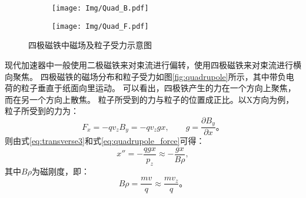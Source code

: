 \begin{figure}[!tbh]
    \centering
    \begin{subfigure}[b]{0.45\textwidth}
        \texttt{[image: Img/Quad\_B.pdf]}
    \end{subfigure}
    \qquad
    \begin{subfigure}[b]{0.4\textwidth}
        \texttt{[image: Img/Quad\_F.pdf]}
    \end{subfigure}
    \caption{四极磁铁中磁场及粒子受力示意图}
    \label{fig:quadrupole}
\end{figure}
现代加速器中一般使用二极磁铁来对束流进行偏转，使用四极磁铁来对束流进行横向聚焦。
四极磁铁的磁场分布和粒子受力如图\eqref{fig:quadrupole}所示\cite{qinq2011ring}，其中带负电荷的粒子垂直于纸面向里运动。
可以看出，四极铁产生的力在一个方向上聚焦，而在另一个方向上散焦。
粒子所受到的力与粒子的位置成正比。以X方向为例，粒子所受到的力为：
\begin{equation}
    \label{eq:quadrupole_force}
    F_x = -q {v}_{z} {B}_{y} = -q {v}_{z} g x, \qquad g=\frac{\partial B_y}{\partial x}\text{。}
\end{equation}
则由式\eqref{eq:transverse3}和式\eqref{eq:quadrupole_force}可得：
\begin{equation}
    \label{eq:quadrupole_force2}
    x'' = -\frac{qgx}{p_z} \approx -\frac{gx}{B\rho},
\end{equation}
其中${B\rho}$为磁刚度，即：
\begin{equation}
    {B\rho}=\frac{mv}{q} \approx \frac{mv_z}{q} \text{。}
\end{equation}

